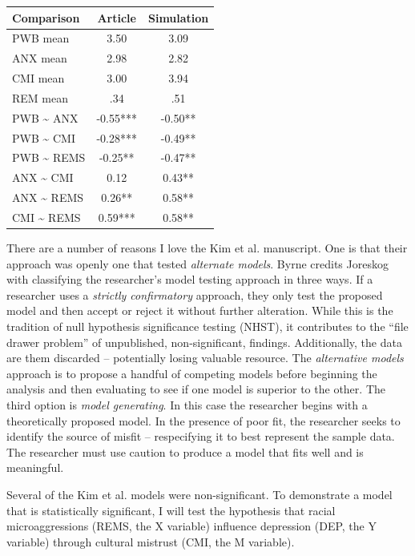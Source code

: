 \documentclass[
  11pt,
]{book}
\begin{document}
\begin{longtable}[]{@{}lcc@{}}
\toprule\noalign{}
Comparison & Article & Simulation \\
\midrule\noalign{}
\endhead
\bottomrule\noalign{}
\endlastfoot
PWB mean & 3.50 & 3.09 \\
ANX mean & 2.98 & 2.82 \\
CMI mean & 3.00 & 3.94 \\
REM mean & .34 & .51 \\
PWB \textasciitilde{} ANX & -0.55*** & -0.50** \\
PWB \textasciitilde{} CMI & -0.28*** & -0.49** \\
PWB \textasciitilde{} REMS & -0.25** & -0.47** \\
ANX \textasciitilde{} CMI & 0.12 & 0.43** \\
ANX \textasciitilde{} REMS & 0.26** & 0.58** \\
CMI \textasciitilde{} REMS & 0.59*** & 0.58** \\
\end{longtable}

There are a number of reasons I love the Kim et al. \citeyearpar{kim_racial_2017} manuscript. One is that their approach was openly one that tested \emph{alternate models}. Byrne \citeyearpar{byrne_structural_2016} credits Joreskog \citep{bollen_testing_1993} with classifying the researcher's model testing approach in three ways. If a researcher uses a \emph{strictly confirmatory} approach, they only test the proposed model and then accept or reject it without further alteration. While this is the tradition of null hypothesis significance testing (NHST), it contributes to the ``file drawer problem'' of unpublished, non-significant, findings. Additionally, the data are them discarded -- potentially losing valuable resource. The \emph{alternative models} approach is to propose a handful of competing models before beginning the analysis and then evaluating to see if one model is superior to the other. The third option is \emph{model generating}. In this case the researcher begins with a theoretically proposed model. In the presence of poor fit, the researcher seeks to identify the source of misfit -- respecifying it to best represent the sample data. The researcher must use caution to produce a model that fits well and is meaningful.

Several of the Kim et al. \citeyearpar{kim_racial_2017} models were non-significant. To demonstrate a model that is statistically significant, I will test the hypothesis that racial microaggressions (REMS, the X variable) influence depression (DEP, the Y variable) through cultural mistrust (CMI, the M variable).
\end{document}
